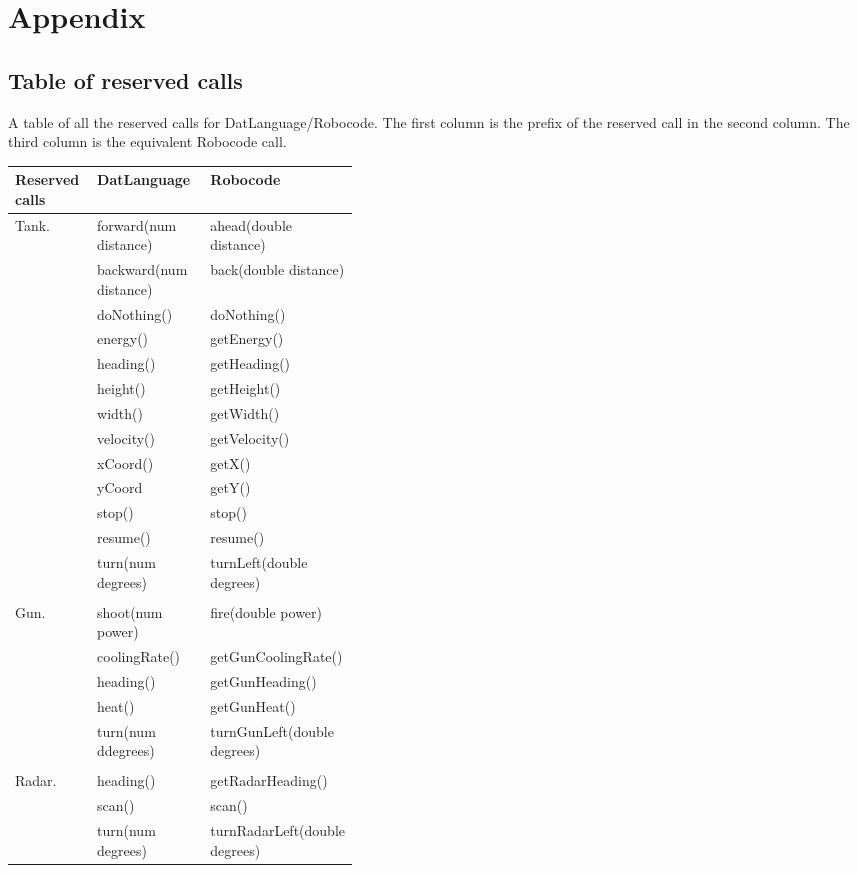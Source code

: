 \chapter{Appendix}
\section{Table of reserved calls}

A table of all the reserved calls for DatLanguage/Robocode. The first column is the prefix of the reserved call in the second column. The third column is the equivalent Robocode call. 

\begin{center}
    \begin{tabular}{ | l| l | p{0.4\linewidth} | }
	\hline
    Reserved calls & DatLanguage & Robocode \\ \hline
    Tank. & forward(num distance) & ahead(double distance)  \\ \hline
     & backward(num distance) & back(double distance)  \\ \hline
     & doNothing() & doNothing() \\ \hline
     & energy() & getEnergy() \\ \hline
     & heading() & getHeading() \\ \hline
     & height() & getHeight() \\ \hline
     & width() & getWidth()  \\ \hline
     & velocity() & getVelocity()  \\ \hline
     & xCoord() & getX() \\ \hline
     & yCoord & getY() \\ \hline
     & stop() & stop() \\ \hline
     & resume() & resume() \\ \hline
     & turn(num degrees) & turnLeft(double degrees)  \\ \hline
     & &  \\ \hline
    Gun. & shoot(num power) & fire(double power) \\ \hline
     & coolingRate() & getGunCoolingRate() \\ \hline
     & heading() & getGunHeading() \\ \hline
     & heat() & getGunHeat() \\ \hline
     & turn(num ddegrees) & turnGunLeft(double degrees)  \\ \hline
     & &  \\ \hline
    Radar. & heading() & getRadarHeading() \\ \hline
     & scan() & scan() \\ \hline
     & turn(num degrees) & turnRadarLeft(double degrees) \\ \hline
    \end{tabular}
\end{center} 
     
